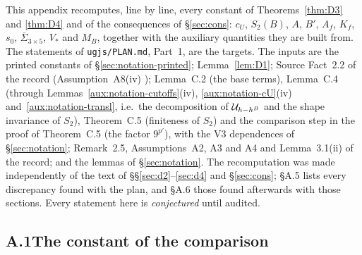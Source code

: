 
This appendix recomputes, line by line, every constant of Theorems~\ref{thm:D3} and
\ref{thm:D4} and of the consequences of \S\ref{sec:cons}: $c_U$, $S_2(B)$, $A$, $B'$, $A_f$,
$K_f$, $s_0$, $\overline\Sigma_{3\times5}$, $V_*$ and $M_B$, together with the auxiliary quantities they
are built from.  The statements of \texttt{ugjs/PLAN.md}, Part~1, are the targets.  The inputs
are the printed constants of \S\ref{sec:notation-printed}; Lemma~\ref{lem:D1}; Source Fact~2.2 of
the record (Assumption~A8(iv) \cite[p.~10]{R}); Lemma~C.2 (the base terms), Lemma~C.4 (through
Lemmas~\ref{aux:notation-cutoffs}(iv), \ref{aux:notation-cU}(iv) and~\ref{aux:notation-transl},
i.e.\ the decomposition of $\mathcal U_{h-h^B}$ and the shape invariance of $S_2$), Theorem~C.5 (finiteness
of $S_2$) and the comparison step in the proof of Theorem~C.5 (the factor $9^{p'}$), with the V3
dependences of \S\ref{sec:notation}; Remark~2.5, Assumptions~A2, A3 and A4 and Lemma~3.1(ii) of the
record; and the lemmas of \S\ref{sec:notation}.  The recomputation was made independently of the text of
\S\S\ref{sec:d2}--\ref{sec:d4} and \S\ref{sec:cons}; \S A.5 lists every discrepancy found
with the plan, and \S A.6 those found afterwards with those sections.  Every statement here is \emph{conjectured} until
audited.

\subsection*{A.1\quad The constant of the comparison}

